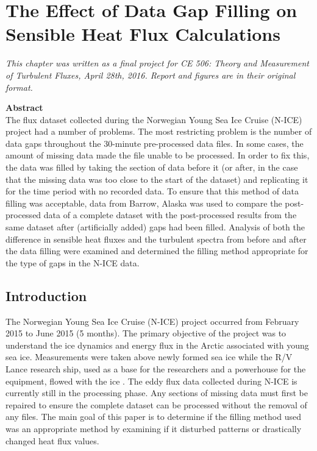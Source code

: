\chapter{The Effect of Data Gap Filling on Sensible Heat Flux Calculations}
\bigskip
\begin{spacing}{1}
\begin{center}
\textit{This chapter was written as a final project for CE 506: Theory and Measurement of Turbulent Fluxes, April 28th, 2016. Report and figures are in their original format.}\\
\end{center}
\bigskip
\noindent \textbf{Abstract}\\
\noindent The flux dataset collected during the Norwegian Young Sea Ice Cruise (N-ICE) project had a number of problems. The most restricting problem is the number of data gaps throughout the 30-minute pre-processed data files. In some cases, the amount of missing data made the file unable to be processed. In order to fix this, the data was filled by taking the section of data before it (or after, in the case that the missing data was too close to the start of the dataset) and replicating it for the time period with no recorded data. To ensure that this method of data filling was acceptable, data from Barrow, Alaska was used to compare the post-processed data of a complete dataset with the post-processed results from the same dataset after (artificially added) gaps had been filled. Analysis of both the difference in sensible heat fluxes and the turbulent spectra from before and after the data filling were examined and determined the filling method appropriate for the type of gaps in the N-ICE data. 
\end{spacing}
\doublespacing

\section{Introduction}
The Norwegian Young Sea Ice Cruise (N-ICE) project occurred from February 2015 to June 2015 (5 months). The primary objective of the project was to understand the ice dynamics and energy flux in the Arctic associated with young sea ice. Measurements were taken above newly formed sea ice while the R/V Lance research ship, used as a base for the researchers and a powerhouse for the equipment, flowed with the ice \citep{granskog:2016}. The eddy flux data collected during N-ICE is currently still in the processing phase. Any sections of missing data must first be repaired to ensure the complete dataset can be processed without the removal of any files. The main goal of this paper is to determine if the filling method used was an appropriate method by examining if it disturbed patterns or drastically changed heat flux values.

